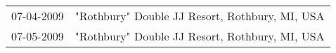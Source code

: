 \begin{supertabular}{ll}
 07-04-2009 &  "Rothbury" Double JJ Resort, Rothbury, MI, USA \\
 07-05-2009 &  "Rothbury" Double JJ Resort, Rothbury, MI, USA \\
\end{supertabular}
